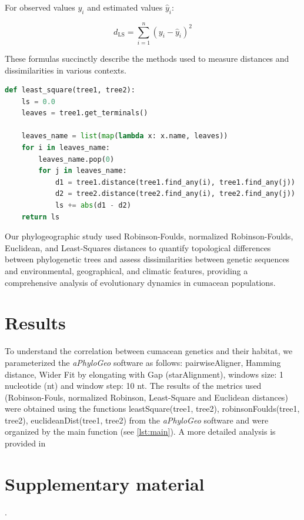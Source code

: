 For observed values $y_i$ and estimated values $\hat{y}_i$:

\begin{equation}\label{eq:ls}
    d_{\text{LS}} = \sum_{i=1}^{n} (y_i - \hat{y}_i)^2
\end{equation}

These formulas succinctly describe the methods used to measure distances and dissimilarities in various contexts.

\begin{lstlisting}[label=lst:LeastSquare, language=Python, caption=Python script for calculating the Least-Square distance using the ete3 package in the aPhyloGeo package]
def least_square(tree1, tree2):
    ls = 0.0
    leaves = tree1.get_terminals()

    leaves_name = list(map(lambda x: x.name, leaves))
    for i in leaves_name:
        leaves_name.pop(0)
        for j in leaves_name:
            d1 = tree1.distance(tree1.find_any(i), tree1.find_any(j))
            d2 = tree2.distance(tree2.find_any(i), tree2.find_any(j))
            ls += abs(d1 - d2)
    return ls
\end{lstlisting}

Our phylogeographic study used Robinson-Foulds, normalized Robinson-Foulds, Euclidean, and Least-Squares distances to quantify topological differences between phylogenetic trees and assess dissimilarities between genetic sequences and environmental, geographical, and climatic features, providing a comprehensive analysis of evolutionary dynamics in cumacean populations.

\section{Results}\label{results}

To understand the correlation between cumacean genetics and their habitat, we parameterized the \textit{aPhyloGeo} software as follows: pairwiseAligner, Hamming distance, Wider Fit by elongating with Gap (starAlignment), windows size: 1 nucleotide (nt) and window step: 10 nt. The results of the metrics used (Robinson-Fouls, normalized Robinson, Least-Square and Euclidean distances) were obtained using the functions leastSquare(tree1, tree2), robinsonFoulds(tree1, tree2), euclideanDist(tree1, tree2) from the \textit{aPhyloGeo} software and were organized by the main function (see \autoref{lst:main}). A more detailed analysis is provided in \section{Supplementary material}.

